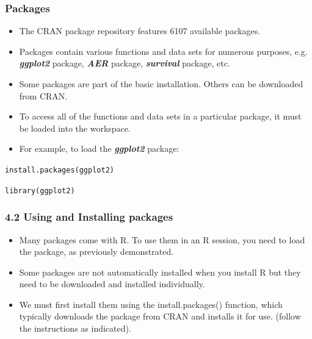 \documentclass{beamer}
\begin{document}
 	\begin{frame}
 		
 		\frametitle{Packages}
 		\begin{itemize}
 			\item The CRAN package repository features 6107 available packages. 
 			\item Packages contain
 			various functions and data sets for numerous purposes, e.g.
 			\textbf{\textit{ggplot2}} package, \textbf{\textit{AER}} package, \textbf{\textit{survival}} package, etc.
 			\item Some packages are part of the basic installation. Others can be
 			downloaded from CRAN.
 			\item To access all of the functions and data sets in a particular package,
 			it must be loaded into the workspace. 
 			\item For example, to load the
 			\textbf{\textit{ggplot2}} package:
 		\end{itemize}
 		
 		\begin{framed}
 		\texttt{install.packages(ggplot2)}
 		
 		\texttt{library(ggplot2)}
 		\end{framed}
 	\end{frame}
 	\begin{frame}
 		\frametitle{4.2 Using and Installing packages}
 		\begin{itemize}
 			\item Many packages come with R. To use them in an R session, you need to load the package, as
 			previously demonstrated.
 			\item Some packages are not automatically installed when you install R but they need to be downloaded
 			and installed individually. 
 			\item We must first install them using the install.packages()
 			function, which typically downloads the package from CRAN and installs it for use. (follow the
 			instructions as indicated).
 		\end{itemize}
 	\end{frame}
\end{document}
